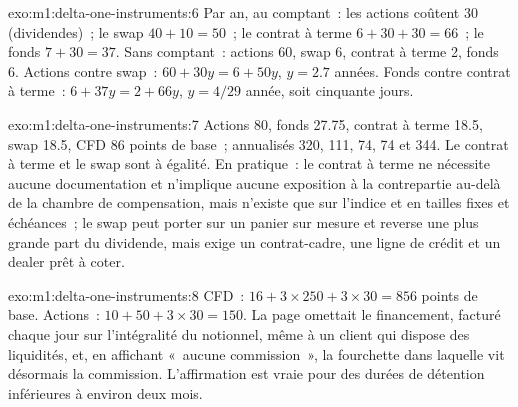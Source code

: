\begin{solution}{exo:m1:delta-one-instruments:6}
Par an, au comptant~: les actions coûtent 30 (dividendes)~; le swap $40 + 10 = 50$~; le
contrat à terme $6 + 30 + 30 = 66$~; le fonds $7 + 30 = 37$. Sans comptant~: actions 60, swap 6,
contrat à terme 2, fonds 6. Actions contre swap~: $60 + 30y = 6 + 50y$, $y = 2.7$ années.
Fonds contre contrat à terme~: $6 + 37y = 2 + 66y$, $y = 4/29$ année, soit cinquante jours.
\end{solution}

\begin{solution}{exo:m1:delta-one-instruments:7}
Actions 80, fonds 27.75, contrat à terme 18.5, swap 18.5, CFD 86 points de base~;
annualisés 320, 111, 74, 74 et 344. Le contrat à terme et le swap sont à égalité. En pratique~: le
contrat à terme ne nécessite aucune documentation et n'implique aucune exposition à la contrepartie au-delà de la
chambre de compensation, mais n'existe que sur l'indice et en tailles fixes et
échéances~; le swap peut porter sur un panier sur mesure et reverse une plus grande part du dividende,
mais exige un contrat-cadre, une ligne de crédit et un dealer prêt à coter.
\end{solution}

\begin{solution}{exo:m1:delta-one-instruments:8}
CFD~: $16 + 3 \times 250 + 3 \times 30 = 856$ points de base. Actions~: $10 + 50 +
3 \times 30 = 150$. La page omettait le financement, facturé chaque jour sur
l'intégralité du notionnel, même à un client qui dispose des liquidités, et, en affichant «~aucune
commission~», la fourchette dans laquelle vit désormais la commission. L'affirmation est
vraie pour des durées de détention inférieures à environ deux mois.
\end{solution}

